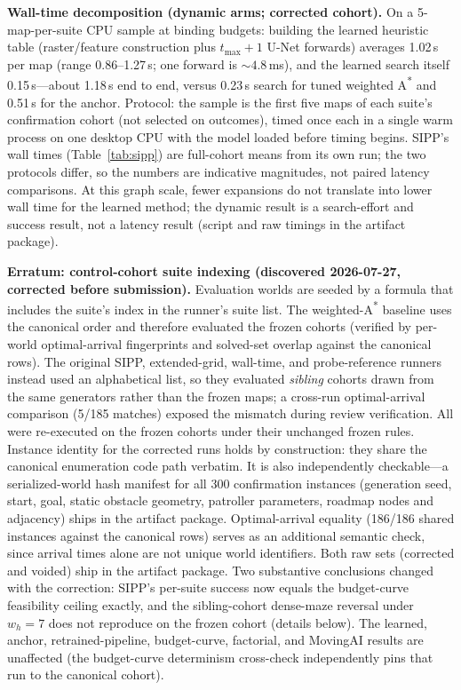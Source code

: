 \documentclass[letterpaper]{article} %
\begin{document}
\textbf{Wall-time decomposition (dynamic arms; corrected cohort).} On a 5-map-per-suite CPU sample at binding budgets: building the learned heuristic table (raster/feature construction plus $t_{\max}{+}1$ U-Net forwards) averages 1.02\,s per map (range 0.86--1.27\,s; one forward is ${\sim}4.8$\,ms), and the learned search itself 0.15\,s---about 1.18\,s end to end, versus 0.23\,s search for tuned weighted A\textsuperscript{*} and 0.51\,s for the anchor. Protocol: the sample is the first five maps of each suite's confirmation cohort (not selected on outcomes), timed once each in a single warm process on one desktop CPU with the model loaded before timing begins. SIPP's wall times (Table~\ref{tab:sipp}) are full-cohort means from its own run; the two protocols differ, so the numbers are indicative magnitudes, not paired latency comparisons. At this graph scale, fewer expansions do not translate into lower wall time for the learned method; the dynamic result is a search-effort and success result, not a latency result (script and raw timings in the artifact package).

\textbf{Erratum: control-cohort suite indexing (discovered 2026-07-27, corrected before submission).} Evaluation worlds are seeded by a formula that includes the suite's index in the runner's suite list. The weighted-A\textsuperscript{*} baseline uses the canonical order and therefore evaluated the frozen cohorts (verified by per-world optimal-arrival fingerprints and solved-set overlap against the canonical rows). The original SIPP, extended-grid, wall-time, and probe-reference runners instead used an alphabetical list, so they evaluated \emph{sibling} cohorts drawn from the same generators rather than the frozen maps; a cross-run optimal-arrival comparison (5/185 matches) exposed the mismatch during review verification. All were re-executed on the frozen cohorts under their unchanged frozen rules. Instance identity for the corrected runs holds by construction: they share the canonical enumeration code path verbatim. It is also independently checkable---a serialized-world hash manifest for all 300 confirmation instances (generation seed, start, goal, static obstacle geometry, patroller parameters, roadmap nodes and adjacency) ships in the artifact package. Optimal-arrival equality (186/186 shared instances against the canonical rows) serves as an additional semantic check, since arrival times alone are not unique world identifiers. Both raw sets (corrected and voided) ship in the artifact package. Two substantive conclusions changed with the correction: SIPP's per-suite success now equals the budget-curve feasibility ceiling exactly, and the sibling-cohort dense-maze reversal under $w_h{=}7$ does not reproduce on the frozen cohort (details below). The learned, anchor, retrained-pipeline, budget-curve, factorial, and MovingAI results are unaffected (the budget-curve determinism cross-check independently pins that run to the canonical cohort).
\end{document}
